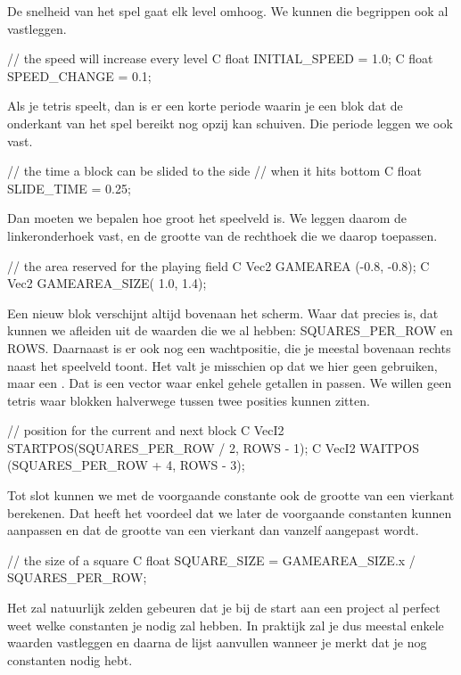 De snelheid van het spel gaat elk level omhoog. We kunnen die begrippen ook al vastleggen.

\begin{code}
// the speed will increase every level
C float INITIAL_SPEED = 1.0;
C float SPEED_CHANGE  = 0.1;
\end{code}

Als je tetris speelt, dan is er een korte periode waarin je een blok dat de onderkant van het spel bereikt nog opzij kan schuiven. Die periode leggen we ook vast.

\begin{code}
// the time a block can be slided to the side
// when it hits bottom
C float SLIDE_TIME = 0.25;
\end{code}

Dan moeten we bepalen hoe groot het speelveld is. We leggen daarom de linkeronderhoek vast, en de grootte van de rechthoek die we daarop toepassen.

\begin{code}
// the area reserved for the playing field 
C Vec2 GAMEAREA     (-0.8, -0.8);
C Vec2 GAMEAREA_SIZE( 1.0,  1.4);
\end{code}

Een nieuw blok verschijnt altijd bovenaan het scherm. Waar dat precies is, dat kunnen we afleiden uit de waarden die we al hebben: SQUARES\_PER\_ROW en ROWS. Daarnaast is er ook nog een wachtpositie, die je meestal bovenaan rechts naast het speelveld toont. Het valt je misschien op dat we hier geen  gebruiken, maar een . Dat is een vector waar enkel gehele getallen in passen. We willen geen tetris waar blokken halverwege tussen twee posities kunnen zitten.

\begin{code}
// position for the current and next block
C VecI2 STARTPOS(SQUARES_PER_ROW / 2, ROWS - 1);
C VecI2 WAITPOS (SQUARES_PER_ROW + 4, ROWS - 3);
\end{code}

Tot slot kunnen we met de voorgaande constante ook de grootte van een vierkant berekenen. Dat heeft het voordeel dat we later de voorgaande constanten kunnen aanpassen en dat de grootte van een vierkant dan vanzelf aangepast wordt.

\begin{code}
// the size of a square
C float SQUARE_SIZE = GAMEAREA_SIZE.x / SQUARES_PER_ROW;
\end{code}

\begin{note}
Het zal natuurlijk zelden gebeuren dat je bij de start aan een project al perfect weet welke constanten je nodig zal hebben. In praktijk zal je dus meestal enkele waarden vastleggen en daarna de lijst aanvullen wanneer je merkt dat je nog constanten nodig hebt.
\end{note}

